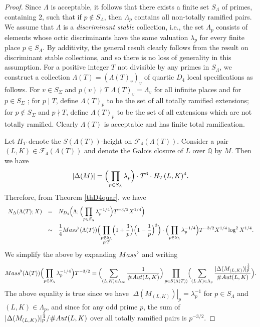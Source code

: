 \documentclass[10pt,a4paper]{amsart}
\def\Aut{{\rm Aut}}
\def\FF{{\mathcal F}}
\def\Mass{{\rm Mass}}
\def\bQ{{\mathbb Q}}
\begin{document}
\begin{proof}
Since $\Lambda$ is acceptable, it follows that there exists a finite
set $S_\Lambda$ of primes, containing $2$, such that if $p\not\in
S_\Lambda$, then $\Lambda_p$ contains all non-totally ramified pairs.
We assume that $\Lambda$ is a {\it discriminant stable} collection,
i.e., the set $\Lambda_p$ consists of elements whose octic
discriminants have the same valuation $\lambda_p$ for every finite
place $p\in S_\Lambda$. By additivity, the general result clearly
follows from the result on discriminant stable collections, and so
there is no loss of generality in this assumption.  For a positive
integer $T$ not divisible by any primes in $S_\Lambda$, we construct a
collection $\Lambda(T)=(\Lambda(T)_v)_v$ of quartic $D_4$ local
specifications as follows. For $v\in S_\Sigma$ and $p(v) \nmid T$
$\Lambda(T)_v=\Lambda_v$ for all infinite places and for $p \in S_\Sigma$ ; for $p\mid T$, define $\Lambda(T)_p$ to be
the set of all totally ramified extensions; for $p\not\in S_\Sigma$
and $p\nmid T$, define $\Lambda(T)_p$ to be the set of all extensions
which are not totally ramified. Clearly $\Lambda(T)$ is acceptable and
has finite total ramification.

Let $H_T$ denote the $S(\Lambda(T))$-height on $\FF_4(\Lambda(T))$.
Consider a pair $(L,K)\in\FF_4(\Lambda(T))$ and denote the Galois
closure of $L$ over $\bQ$ by $M$. Then we have
\begin{equation*}
|\Delta(M)|=\Bigl(\prod_{p\in S_\Lambda} \lambda_p\Bigr)\cdot T^6\cdot H_T(L,K)^4.
\end{equation*}
Therefore, from Theorem \ref{thD4quar}, we have
\begin{equation*}
\begin{array}{rcl}
\displaystyle N_\Delta(\Lambda(T);X)&=&
\displaystyle N_{D_4}\Bigl(\Lambda;\Bigl(\prod_{p\in
S_\Lambda} \lambda_p^{-1/4} \Bigr)T^{-3/2}X^{1/4}\Bigr)
\\[.2in]&\sim &\displaystyle
\frac14\Mass^\flat(\Lambda(T))\Bigl(\prod_{\substack{p\not\in S_\Lambda\\p\nmid T}}
\Bigl(1+\frac{3}{p}\Bigr)\Bigl(1-\frac{1}{p}\Bigr)^3\Bigr)\cdot
\Bigl(\prod_{p\in S_\Lambda}\lambda_p^{-1/4}\Bigr)T^{-3/2}X^{1/4}\log^2 X^{1/4}.
\end{array}
\end{equation*}
We simplify the above by expanding $\Mass^\flat$ and writing
\begin{equation*}
\Mass^\flat(\Lambda(T))\Bigl(\prod_{p\in S_\Lambda}\lambda_p^{-1/4}\Bigr)T^{-3/2}
=\Bigl(\sum_{(L,K)\in\Lambda_\infty}\frac{1}{\#\Aut(L,K)}\Bigr)
\prod_{p\in S(\Lambda(T))}\Bigl(\sum_{(L,K)\in\Lambda_p}
\frac{|\Delta(M_{(L,K)})|_p^{\frac14}}{\#\Aut(L,K)}\Bigr).
\end{equation*}
The above equality is true since we have
$|\Delta(M_{(L,K)})|_p=\lambda_p^{-1}$ for $p\in S_\Lambda$ and
$(L,K)\in\Lambda_p$, and since for any odd prime $p$, the sum of
$|\Delta(M_{(L,K)})|_p^{\frac14}/\#\Aut(L,K)$ over all totally
ramified pairs is $p^{-3/2}$.


\end{proof}
\end{document}
